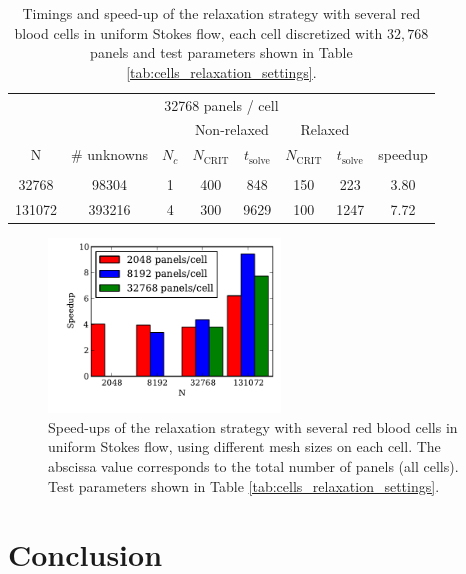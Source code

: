 \documentclass[final,leqno,]{siamltex1213}
\newcommand{\ncrit}{N_{\text{CRIT}}}
\newcommand{\tsolve}{t_{\text{solve}}}
\begin{document}
\begin{table}[htdp]
\footnotesize
\begin{center}
\begin{tabular}{c|c|c|cc|cc|c}
\multicolumn{8}{c}{32768 panels / cell} \\
& & & \multicolumn{2}{c}{Non-relaxed} & \multicolumn{2}{c}{Relaxed}\\
N & \# unknowns & $N_c$ & $\ncrit$ & $\tsolve$ & $\ncrit$ & $\tsolve$ & speedup \\ \hline
& & & & & & &  \\
32768 & 98304 & 1 & 400 & 848 & 150 & 223 & 3.80 \\
131072 & 393216 & 4 & 300 & 9629\footnotemark[1] & 100 & 1247 & 7.72\footnotemark[1] \\	
\end{tabular}
\end{center}
\caption{Timings and speed-up of the relaxation strategy with several red blood cells in uniform Stokes flow, each cell discretized with $32,768$ panels and test parameters shown in Table \ref{tab:cells_relaxation_settings}.}
\label{tab:multiple_cell_relaxation_results_32768}
\end{table}


\begin{figure}[ht]
\begin{center}
	\includegraphics[natwidth=4in,natheight=3in,width=0.55\textwidth]{EthrocyteMultipleCellSpeedup.pdf}
	\caption{Speed-ups of the relaxation strategy with several red blood cells in uniform Stokes flow, using different mesh sizes on each cell. The abscissa value corresponds to the total number of panels (all cells). Test parameters shown in Table \ref{tab:cells_relaxation_settings}.}
	\label{fig:multiple_cell_speedup}
\end{center}
\end{figure}




\section{Conclusion} 
\end{document}
